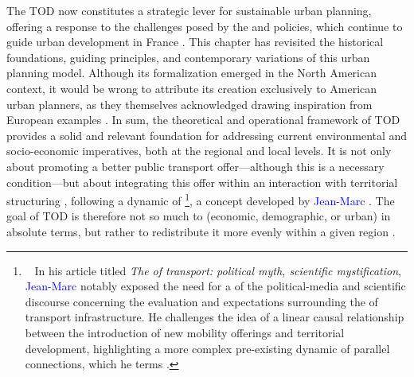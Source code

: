 \begin{refsegment}
The \acrfull{TOD} now constitutes a strategic lever for sustainable urban planning, offering a response to the challenges posed by the  and  policies, which continue to guide urban development in France \textcolor{blue}{\autocite[14]{sebban_complementarite_2003}}. This chapter has revisited the historical foundations, guiding principles, and contemporary variations of this urban planning model. Although its formalization emerged in the North American context, it would be wrong to attribute its creation exclusively to American urban planners, as they themselves acknowledged drawing inspiration from European examples \textcolor{blue}{\autocite[15]{renne_emerging_2004}}. In sum, the theoretical and operational framework of \acrshort{TOD} provides a solid and relevant foundation for addressing current environmental and socio-economic imperatives, both at the regional and local levels. It is not only about promoting a better public transport offer—although this is a necessary condition—but about integrating this offer within an interaction with territorial structuring \textcolor{blue}{\autocite[9]{bernier_atlas_2023}}, following a dynamic of \footnote{~
    In his article titled \textsl{The  of transport: political myth, scientific mystification}, \textcolor{blue}{Jean-Marc} \textcolor{blue}{\textcite[239]{offner__1993}} notably exposed the need for a  of the political-media and scientific discourse concerning the evaluation and expectations surrounding the  of transport infrastructure. He challenges the idea of a linear causal relationship between the introduction of new mobility offerings and territorial development, highlighting a more complex pre-existing dynamic of parallel connections, which he terms .
}, a concept developed by \textcolor{blue}{Jean-Marc} \textcolor{blue}{\textcite[239]{offner__1993}}. The goal of \acrshort{TOD} is therefore not so much to  (economic, demographic, or urban) in absolute terms, but rather to redistribute it more evenly within a given region \textcolor{blue}{\autocite[82]{cervero_transit_1998}}.%


\end{refsegment}
